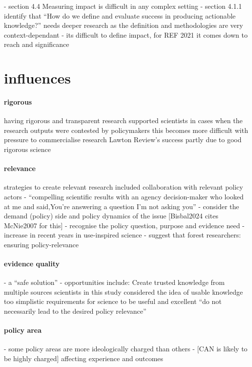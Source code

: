 \cite{BednarekSHG2015} - section 4.4 Measuring impact is difficult in any complex setting 
\cite{JagannathanEtAl2023} - section 4.1.1 identify that ``How do we define and evaluate success in producing actionable knowledge?'' needs deeper research as the definition and methodologies are very context-dependant
\cite{KEU2021impact} - its difficult to define impact, for REF 2021 it comes down to reach and significance

\section{influences}


\paragraph{rigorous}
\cite{OjanenBKP2021} having rigorous and transparent research supported scientists in cases when the research outputs were contested by policymakers
\cite{DanfordDR2009} this becomes more difficult with pressure to commercialise research
\cite{RoseBOP2018} Lawton Review's success partly due to good rigorous science
\paragraph{relevance}
\cite{OjanenBKP2021} strategies to create relevant research included collaboration with relevant policy actors
\cite{Gerber2023} - ``compelling scientific results with an agency decision-maker who looked at me and said,You're answering a question I'm not asking you''
\cite{GluckmanBK2021} - consider the demand (policy) side and policy dynamics of the issue [Bisbal2024 cites McNie2007 for this]
\cite{GluckmanBK2021} - recognise the policy question, purpose and evidence need
\cite{LubchencoR2020} - increase in recent years in use-inspired science
\cite{OjanenBKP2021} - suggest that forest researchers: ensuring policy-relevance
\paragraph{evidence quality}
\cite{CairneyO2020} - a ``safe solution''
\cite{MoallemiZHSMZHKHMGLB2023} - opportunities include: Create trusted knowledge from multiple sources
\cite{IbarraJOBCIMRS2022} scientists in this study considered the idea of usable knowledge too simplistic 
\cite{IbarraJOBCIMRS2022} requirements for science to be useful and excellent ``do not necessarily lead to the desired policy relevance''
\paragraph{policy area}
\cite{SaxonbergSL2023} - some policy areas are more ideologically charged than others - [CAN is likely to be highly charged] affecting experience and outcomes 

